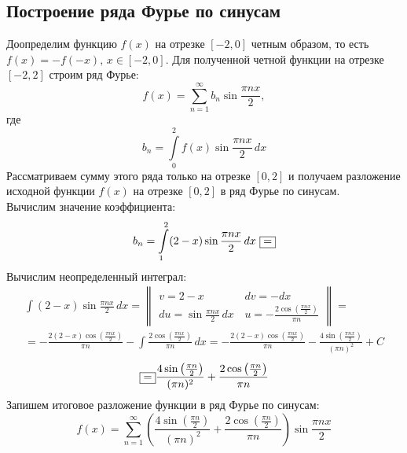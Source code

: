\documentclass[a5paper, 10pt]{article}
\theoremstyle{definition}
\theoremstyle{plain}
\theoremstyle{remark}
\begin{document}
\newpage
\subsection{Построение ряда Фурье по синусам}
Доопределим функцию $f(x)$ на отрезке $[-2, 0]$ четным образом, то есть $f(x) = -f(-x), \, x \in [-2, 0]$. Для полученной четной функции на отрезке $[-2, 2]$ строим ряд Фурье:
\begin{equation*} 
f(x) = \sum \limits_{n=1}^{\infty} b_n \sin \frac{\pi n x}{2},
\end{equation*}
где
\begin{equation*} 
b_n =  \int \limits_{0}^{2} f(x) \sin \frac{\pi n x}{2} \, dx
\end{equation*}
Рассматриваем сумму этого ряда только на отрезке $[0, 2]$ и получаем разложение исходной функции $f(x)$ на отрезке  $[0, 2]$ в ряд Фурье по синусам.\\
Вычислим значение коэффициента:
\begin{equation*} 
b_n =  \int \limits_{1}^{2} (2-x) \sin \frac{\pi n x}{2} \, dx \, \, \fbox{=}
\end{equation*}
Вычислим неопределенный интеграл:
\begin{multline*} 
 \int  (2-x) \sin \frac{\pi n x}{2} \, dx = 
\begin{Vmatrix}
v = 2-x \, & dv = -dx\\
du =   \sin \frac{\pi n x}{2} \, dx \, & u = -\frac{2 \cos \left( \frac{\pi n x}{2}\right)}{\pi n}
\end{Vmatrix}
=\\= - \frac{2 (2-x) \cos \left( \frac{\pi n x}{2}\right)}{\pi n} - \int \frac{2 \cos \left( \frac{\pi n x}{2}\right)}{\pi n}  \, dx =
-\frac{2 (2-x) \cos \left( \frac{\pi n x}{2}\right)}{\pi n} - \frac{4 \sin \left( \frac{\pi n x}{2} \right)}{(\pi n)^2} + C
\end{multline*}
\begin{equation*} 
 \fbox{=} \frac{4 \sin \left( \frac{\pi n}{2}\right)}{(\pi n)^2} + \frac{2 \cos \left( \frac{\pi n}{2}\right)}{\pi n}
\end{equation*}
Запишем итоговое разложение функции в ряд Фурье по синусам:
\begin{equation*} 
f(x) = \sum \limits_{n=1}^{\infty} \left( \frac{4 \sin \left( \frac{\pi n}{2}\right)}{(\pi n)^2} + \frac{2 \cos \left( \frac{\pi n}{2}\right)}{\pi n} \right) \sin \frac{\pi n x}{2}
\end{equation*}


\newpage
\end{document}
